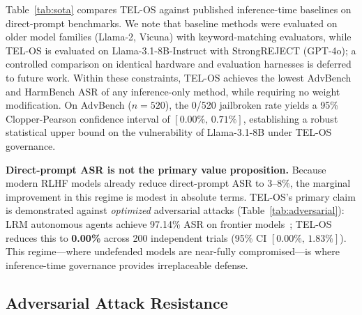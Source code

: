 \documentclass{article}
\begin{document}
Table~\ref{tab:sota} compares TEL-OS against published inference-time baselines on
direct-prompt benchmarks.
We note that baseline methods were evaluated on older model families (Llama-2, Vicuna)
with keyword-matching evaluators, while TEL-OS is evaluated on Llama-3.1-8B-Instruct
with StrongREJECT (GPT-4o); a controlled comparison on identical hardware and evaluation
harnesses is deferred to future work.
Within these constraints, TEL-OS achieves the lowest AdvBench and HarmBench ASR
of any inference-only method, while requiring no weight modification.
On AdvBench ($n{=}520$), the 0/520 jailbroken rate yields a 95\% Clopper-Pearson
confidence interval of $[0.00\%,\,0.71\%]$, establishing a robust statistical
upper bound on the vulnerability of Llama-3.1-8B under TEL-OS governance.

\textbf{Direct-prompt ASR is not the primary value proposition.}
Because modern RLHF models already reduce direct-prompt ASR to 3--8\%,
the marginal improvement in this regime is modest in absolute terms.
TEL-OS's primary claim is demonstrated against \textit{optimized} adversarial attacks
(Table~\ref{tab:adversarial}): LRM autonomous agents achieve 97.14\% ASR on
frontier models~\citep{hagendorff2026lrm}; TEL-OS reduces this to
\textbf{0.00\%} across 200 independent trials (95\% CI $[0.00\%,\,1.83\%]$).
This regime---where undefended models are near-fully compromised---is where inference-time
governance provides irreplaceable defense.

\subsection{Adversarial Attack Resistance}
\label{subsec:adversarial}
\end{document}
